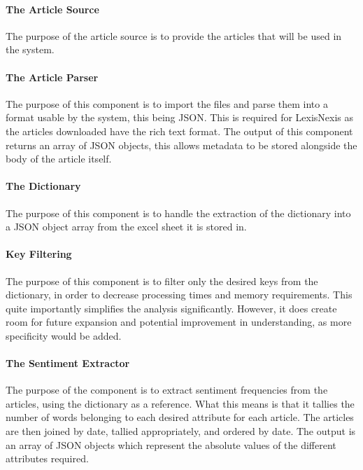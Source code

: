 \paragraph{The Article Source}

The purpose of the article source is to provide the articles that will be used in the system.

\paragraph{The Article Parser}

The purpose of this component is to import the files and parse them into a format usable by the system, this being JSON. This is required for LexisNexis as the articles downloaded have the rich text format. The output of this component returns an array of JSON objects, this allows metadata to be stored alongside the body of the article itself.

\paragraph{The Dictionary}

The purpose of this component is to handle the extraction of the dictionary into a JSON object array from the excel sheet it is stored in.

\paragraph{Key Filtering}

The purpose of this component is to filter only the desired keys from the dictionary, in order to decrease processing times and memory requirements. This quite importantly simplifies the analysis significantly. However, it does create room for future expansion and potential improvement in understanding, as more specificity would be added.

\paragraph{The Sentiment Extractor}

The purpose of the component is to extract sentiment frequencies from the articles, using the dictionary as a reference. What this means is that it tallies the number of words belonging to each desired attribute for each article. The articles are then joined by date, tallied appropriately, and ordered by date. The output is an array of JSON objects which represent the absolute values of the different attributes required.

